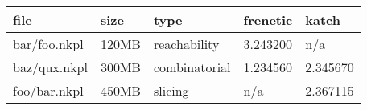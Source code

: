 \begin{tabular}{lllll}
\toprule
file & size & type & frenetic & katch \\
\midrule
bar/foo.nkpl & 120MB & reachability & 3.243200 & n/a \\
baz/qux.nkpl & 300MB & combinatorial & 1.234560 & 2.345670 \\
foo/bar.nkpl & 450MB & slicing & n/a & 2.367115 \\
\bottomrule
\end{tabular}

